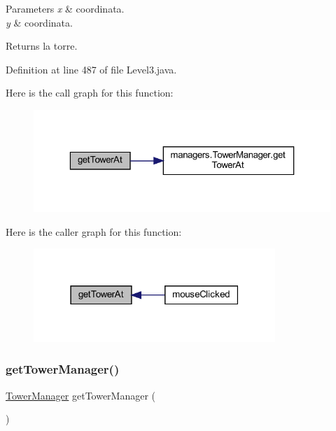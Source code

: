 \begin{DoxyParams}{Parameters}
{\em x} & coordinata. \\
\hline
{\em y} & coordinata.\\
\hline
\end{DoxyParams}
\begin{DoxyReturn}{Returns}
la torre. 
\end{DoxyReturn}


Definition at line 487 of file Level3.\+java.

Here is the call graph for this function\+:\nopagebreak
\begin{figure}[H]
\begin{center}
\leavevmode
\includegraphics[width=323pt]{classscenes_1_1_level3_a4345f2e80059788e5ab1dd1cf0ff2c04_cgraph}
\end{center}
\end{figure}
Here is the caller graph for this function\+:\nopagebreak
\begin{figure}[H]
\begin{center}
\leavevmode
\includegraphics[width=259pt]{classscenes_1_1_level3_a4345f2e80059788e5ab1dd1cf0ff2c04_icgraph}
\end{center}
\end{figure}
\mbox{\label{classscenes_1_1_level3_a6fff8a01141127e3c2897a077e5dee92}} 
\subsubsection{\texorpdfstring{get\+Tower\+Manager()}{getTowerManager()}}
{\footnotesize\ttfamily \hyperlink{classmanagers_1_1_tower_manager}{Tower\+Manager} get\+Tower\+Manager (\begin{DoxyParamCaption}{ }\end{DoxyParamCaption})}



